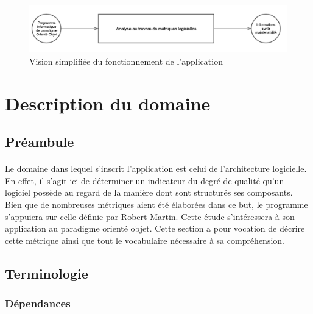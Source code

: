 \documentclass{scrartcl}
\begin{document}
\begin{figure}[ht]
    \centering
    \includegraphics[scale=0.65]{img/intro.png}
    \caption{Vision simplifiée du fonctionnement de l'application} 
    \label{fig:intro}
\end{figure}
    





\newpage
\section{Description du domaine}

\subsection{Préambule}

    \paragraph{}Le domaine dans lequel s'inscrit l'application est celui de l'architecture logicielle. En effet, il s'agit ici de déterminer un indicateur du degré de qualité qu'un logiciel possède au regard de la manière dont sont structurés ses composants. Bien que de nombreuses métriques aient été élaborées dans ce but, le programme s'appuiera sur celle définie par Robert Martin\cite{Martin:1994}. Cette étude s'intéressera à son application au paradigme orienté objet. Cette section a pour vocation de décrire cette métrique ainsi que tout le vocabulaire nécessaire à sa compréhension.

    

\subsection{Terminologie}
\label{mm:terminologie}

\subsubsection{Dépendances}
\end{document}
